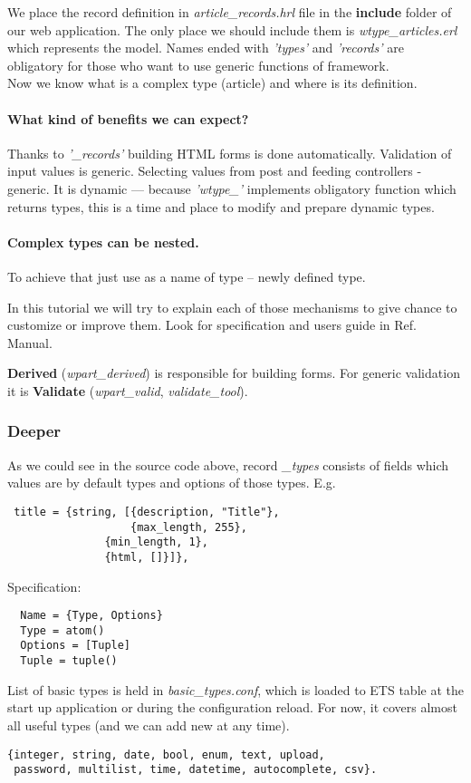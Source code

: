 We place the record definition in {\it article\_records.hrl} file in the \textbf{include} folder of our web
application.
The only place we should include them is {\it wtype\_articles.erl} which represents
the model.
Names ended with {\it 'types'} and {\it 'records'} are obligatory for those who want to use
generic functions of framework. \\
Now we know what is a complex type (article) and where is its definition. 
\newline 
\paragraph{What kind of benefits we can expect?}   
Thanks to {\it '\_records'} building HTML forms
is done automatically. Validation of input values is generic. Selecting values from
post and feeding controllers - generic. It is dynamic --- because {\it 'wtype\_'}
implements obligatory function which returns types, this is a time and place to
modify and prepare dynamic types. 
\paragraph{Complex types can be nested.} To achieve that just use as a name of
type -- newly defined type.  \newline

In this tutorial we will try to explain each of those mechanisms to give
chance to customize or improve them. Look for specification and users guide in
Ref. Manual. \newline

 \textbf{Derived} ({\it wpart\_derived}) is responsible for building forms. For
generic validation it is \textbf{Validate} ({\it wpart\_valid}, {\it validate\_tool}). 
\subsubsection{Deeper}
As we could see in the source code above, record \textit{\_types} consists of
fields which values are by default types and options of those types. E.g. 
\begin{Verbatim}
 title = {string, [{description, "Title"},
                   {max_length, 255},
	           {min_length, 1},
	           {html, []}]},
\end{Verbatim}
Specification:
\begin{verbatim}
  Name = {Type, Options}
  Type = atom()
  Options = [Tuple]
  Tuple = tuple()
\end{verbatim}  
  List of basic types is held in {\it basic\_types.conf}, which is loaded to ETS table at
  the start up application or during the configuration reload. 
  For now, it covers almost all useful types (and we can add new at any time). 
\begin{verbatim}
{integer, string, date, bool, enum, text, upload,
 password, multilist, time, datetime, autocomplete, csv}.
\end{verbatim}  

